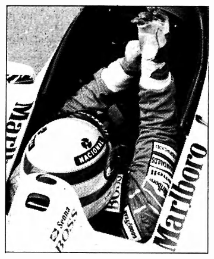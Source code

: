 \begin{figure}[ht]
\begin{minipage}[5cm]{0.3\textwidth}
\begin{subfigure}{3cm}
        \end{subfigure}

        \begin{subfigure}{3cm}
            \includegraphics[width=\linewidth]{Images/logo FPs/photos/GDL-1993-03-13-a-i0130.jpg}
            
        \end{subfigure}


\end{minipage}
\end{figure}
